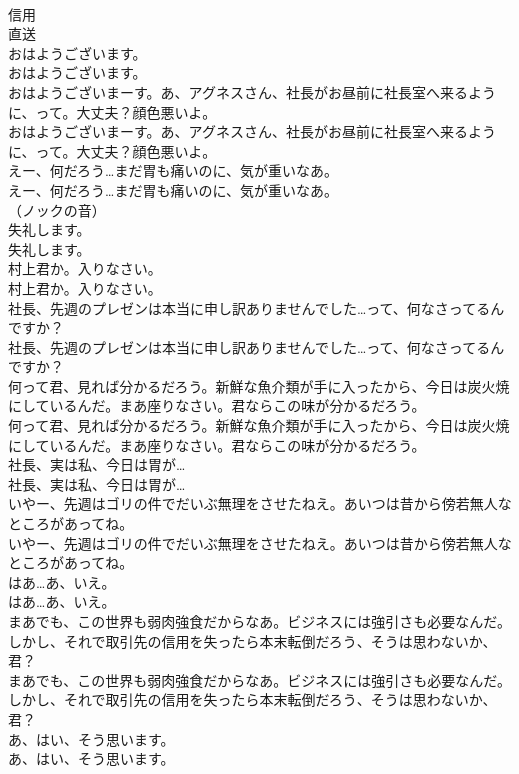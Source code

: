 \documentclass[8pt]{extreport}
\begin{document}
\begin{CJK}{UTF8}{min}
\\	信用
\\	直送
\\	おはようございます。	
\\	おはようございます。 
\\	おはようございまーす。あ、アグネスさん、社長がお昼前に社長室へ来るように、って。大丈夫？顔色悪いよ。	
\\	おはようございまーす。あ、アグネスさん、社長がお昼前に社長室へ来るように、って。大丈夫？顔色悪いよ。 
\\	えー、何だろう…まだ胃も痛いのに、気が重いなあ。	
\\	えー、何だろう…まだ胃も痛いのに、気が重いなあ。 
\\	（ノックの音）	
\\	失礼します。	
\\	失礼します。 
\\	村上君か。入りなさい。	
\\	村上君か。入りなさい。 
\\	社長、先週のプレゼンは本当に申し訳ありませんでした…って、何なさってるんですか？	
\\	社長、先週のプレゼンは本当に申し訳ありませんでした…って、何なさってるんですか？ 
\\	何って君、見れば分かるだろう。新鮮な魚介類が手に入ったから、今日は炭火焼にしているんだ。まあ座りなさい。君ならこの味が分かるだろう。	
\\	何って君、見れば分かるだろう。新鮮な魚介類が手に入ったから、今日は炭火焼にしているんだ。まあ座りなさい。君ならこの味が分かるだろう。 
\\	社長、実は私、今日は胃が…	
\\	社長、実は私、今日は胃が… 
\\	いやー、先週はゴリの件でだいぶ無理をさせたねえ。あいつは昔から傍若無人なところがあってね。	
\\	いやー、先週はゴリの件でだいぶ無理をさせたねえ。あいつは昔から傍若無人なところがあってね。 
\\	はあ…あ、いえ。	
\\	はあ…あ、いえ。 
\\	まあでも、この世界も弱肉強食だからなあ。ビジネスには強引さも必要なんだ。しかし、それで取引先の信用を失ったら本末転倒だろう、そうは思わないか、君？	
\\	まあでも、この世界も弱肉強食だからなあ。ビジネスには強引さも必要なんだ。しかし、それで取引先の信用を失ったら本末転倒だろう、そうは思わないか、君？ 
\\	あ、はい、そう思います。	
\\	あ、はい、そう思います。 

\end{CJK}
\end{document}
